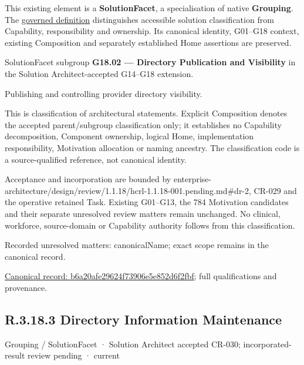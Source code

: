 This existing element is a \textbf{SolutionFacet}, a specialisation of native
\textbf{Grouping}. The \href{\detokenize{../../../../../../../governance/continuum-representation.md#solutionfacet-classification--1119-candidate}}{governed definition}
distinguishes accessible solution classification from Capability, responsibility
and ownership. Its canonical identity, G01–G18 context, existing Composition
and separately established Home assertions are preserved.



SolutionFacet subgroup \textbf{G18.02 — Directory Publication and Visibility} in the Solution Architect-accepted G14–G18 extension.



Publishing and controlling provider directory visibility.



This is classification of architectural statements. Explicit Composition denotes the accepted parent/subgroup classification only; it establishes no Capability decomposition, Component ownership, logical Home, implementation responsibility, Motivation allocation or naming ancestry. The classification code is a source-qualified reference, not canonical identity.



Acceptance and incorporation are bounded by enterprise-architecture/design/review/1.1.18/hcrl-1.1.18-001.pending.md\#dr-2, CR-029 and the operative retained Task. Existing G01–G13, the 784 Motivation candidates and their separate unresolved review matters remain unchanged. No clinical, workforce, source-domain or Capability authority follows from this classification.


{\small Recorded unresolved matters: canonicalName; exact scope remains in the canonical record.}\par
{\footnotesize \href{../../../../../../../continuum/grouping/b6a20afe29624f73906e5e852d6f2fbf.md}{Canonical record: b6a20afe29624f73906e5e852d6f2fbf}; full qualifications and provenance.}\par
\subsection*{R.3.18.3 Directory Information Maintenance}
\label{navigation:R.3.18.3}

\label{element:d2876dff4f5444e3b71bdeba487b2d6b}
{\small Grouping / SolutionFacet · Solution Architect accepted CR-030; incorporated-result review pending · current}\par

